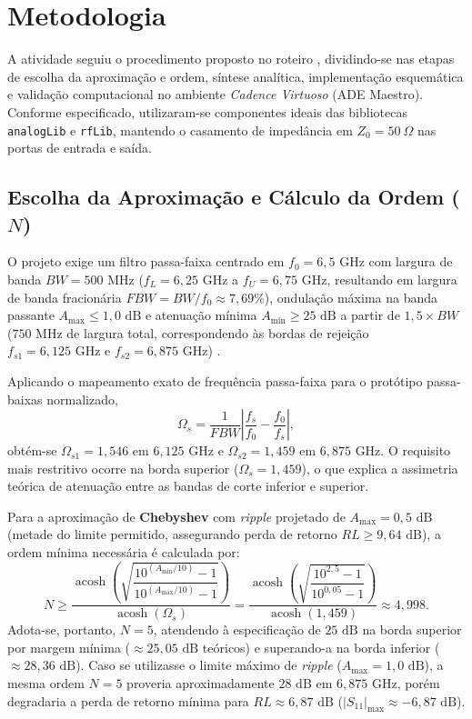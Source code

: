 \section{Metodologia}

A atividade seguiu o procedimento proposto no roteiro \cite{Filter1}, dividindo-se nas etapas de escolha da aproximação e ordem, síntese analítica, implementação esquemática e validação computacional no ambiente \textit{Cadence Virtuoso} (ADE Maestro). Conforme especificado, utilizaram-se componentes ideais das bibliotecas \texttt{analogLib} e \texttt{rfLib}, mantendo o casamento de impedância em $Z_0 = 50~\Omega$ nas portas de entrada e saída.

\subsection{Escolha da Aproximação e Cálculo da Ordem ($N$)}

O projeto exige um filtro passa-faixa centrado em $f_0 = 6{,}5\text{ GHz}$ com largura de banda $BW = 500\text{ MHz}$ ($f_L = 6{,}25\text{ GHz}$ a $f_U = 6{,}75\text{ GHz}$, resultando em largura de banda fracionária $FBW = BW/f_0 \approx 7{,}69\%$), ondulação máxima na banda passante $A_{\max} \le 1{,}0\text{ dB}$ e atenuação mínima $A_{\min} \ge 25\text{ dB}$ a partir de $1{,}5 \times BW$ ($750\text{ MHz}$ de largura total, correspondendo às bordas de rejeição $f_{s1} = 6{,}125\text{ GHz}$ e $f_{s2} = 6{,}875\text{ GHz}$) \cite{Filter1}.

Aplicando o mapeamento exato de frequência passa-faixa para o protótipo passa-baixas normalizado,
\begin{equation}
    \Omega_s = \frac{1}{FBW}\left|\frac{f_s}{f_0} - \frac{f_0}{f_s}\right|,
\end{equation}
obtém-se $\Omega_{s1} = 1{,}546$ em $6{,}125\text{ GHz}$ e $\Omega_{s2} = 1{,}459$ em $6{,}875\text{ GHz}$. O requisito mais restritivo ocorre na borda superior ($\Omega_s = 1{,}459$), o que explica a assimetria teórica de atenuação entre as bandas de corte inferior e superior.

Para a aproximação de \textbf{Chebyshev} com \textit{ripple} projetado de $A_{\max} = 0{,}5\text{ dB}$ (metade do limite permitido, assegurando perda de retorno $RL \ge 9{,}64\text{ dB}$), a ordem mínima necessária é calculada por:
\begin{equation}
    N \ge \frac{\operatorname{acosh}\!\left(\sqrt{\dfrac{10^{(A_{\min}/10)} - 1}{10^{(A_{\max}/10)} - 1}}\right)}{\operatorname{acosh}(\Omega_s)} = \frac{\operatorname{acosh}\!\left(\sqrt{\dfrac{10^{2{,}5} - 1}{10^{0{,}05} - 1}}\right)}{\operatorname{acosh}(1{,}459)} \approx 4{,}998.
\end{equation}
Adota-se, portanto, $N = 5$, atendendo à especificação de $25\text{ dB}$ na borda superior por margem mínima ($\approx 25{,}05\text{ dB}$ teóricos) e superando-a na borda inferior ($\approx 28{,}36\text{ dB}$). Caso se utilizasse o limite máximo de \textit{ripple} ($A_{\max} = 1{,}0\text{ dB}$), a mesma ordem $N = 5$ proveria aproximadamente $28\text{ dB}$ em $6{,}875\text{ GHz}$, porém degradaria a perda de retorno mínima para $RL \approx 6{,}87\text{ dB}$ ($|S_{11}|_{\max} \approx -6{,}87\text{ dB}$).

